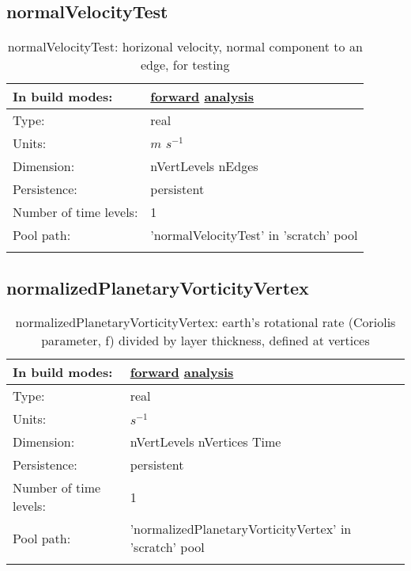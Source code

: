 \subsection[normalVelocityTest]{normalVelocityTest}
\label{subsec:var_sec_scratch_normalVelocityTest}
\begin{center}
\begin{longtable}{| p{2.0in} | p{4.0in} |}
        \hline 
        In build modes: & \hyperref[subsec:forward_var_tab_scratch]{forward} \hyperref[subsec:analysis_var_tab_scratch]{analysis} \\
        \hline 
        Type: & real \\
        \hline 
        Units: & $m$ $s^{-1}$ \\
        \hline 
        Dimension: & nVertLevels nEdges \\
        \hline 
        Persistence: & persistent \\
        \hline 
        Number of time levels: & 1 \\
        \hline 
            Pool path: & 'normalVelocityTest' in 'scratch' pool
 \\
		 \hline 
    \caption{normalVelocityTest: horizonal velocity, normal component to an edge, for testing}
\end{longtable}
\end{center}
\subsection[normalizedPlanetaryVorticityVertex]{normalizedPlanetaryVorticityVertex}
\label{subsec:var_sec_scratch_normalizedPlanetaryVorticityVertex}
\begin{center}
\begin{longtable}{| p{2.0in} | p{4.0in} |}
        \hline 
        In build modes: & \hyperref[subsec:forward_var_tab_scratch]{forward} \hyperref[subsec:analysis_var_tab_scratch]{analysis} \\
        \hline 
        Type: & real \\
        \hline 
        Units: & $s^{-1}$ \\
        \hline 
        Dimension: & nVertLevels nVertices Time \\
        \hline 
        Persistence: & persistent \\
        \hline 
        Number of time levels: & 1 \\
        \hline 
            Pool path: & 'normalizedPlanetaryVorticityVertex' in 'scratch' pool
 \\
		 \hline 
    \caption{normalizedPlanetaryVorticityVertex: earth's rotational rate (Coriolis parameter, f) divided by layer thickness, defined at vertices}
\end{longtable}
\end{center}

